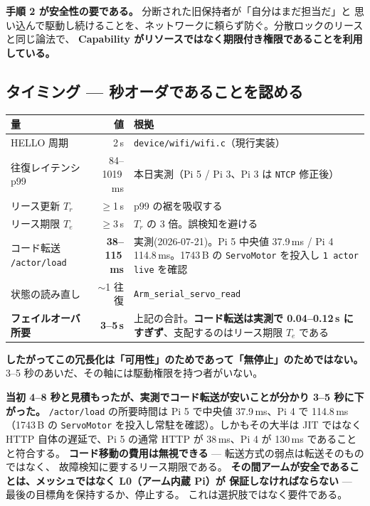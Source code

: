 \documentclass[11pt,a4paper]{article}
\newcommand{\code}[1]{\texttt{#1}}
\newcommand{\prob}[1]{\textbf{\textcolor{red!55!black}{#1}}}
\newcommand{\good}[1]{\textbf{\textcolor{green!45!black}{#1}}}
\begin{document}
\prob{手順 2 が安全性の要である。} 分断された旧保持者が「自分はまだ担当だ」と
思い込んで駆動し続けることを、ネットワークに頼らず防ぐ。分散ロックのリースと同じ論法で、
\textbf{Capability がリソースではなく期限付き権限であることを利用している。}

\subsection{タイミング --- 秒オーダであることを認める}

\begin{center}
\begin{tabular}{@{}l r l@{}}
\toprule
\textbf{量} & \textbf{値} & \textbf{根拠}\\
\midrule
HELLO 周期 & 2\,s & \code{device/wifi/wifi.c}（現行実装）\\
往復レイテンシ p99 & 84--1019\,ms & 本日実測（Pi 5 / Pi 3、Pi 3 は \code{NTCP} 修正後）\\
リース更新 $T_r$ & $\ge$1\,s & p99 の裾を吸収する\\
リース期限 $T_e$ & $\ge$3\,s & $T_r$ の 3 倍。誤検知を避ける\\
コード転送 \code{/actor/load} & \good{38--115\,ms} & 実測(2026-07-21)。Pi 5 中央値 37.9\,ms /
  Pi 4 114.8\,ms。1743\,B の \code{ServoMotor} を投入し \texttt{1 actor live} を確認\\
状態の読み直し & $\sim$1 往復 & \code{Arm\_serial\_servo\_read}\\
\midrule
\prob{フェイルオーバ所要} & \prob{3--5\,s} & 上記の合計。\good{コード転送は実測で
  0.04--0.12\,s にすぎず}、支配するのはリース期限 $T_e$ である\\
\bottomrule
\end{tabular}
\end{center}

\prob{したがってこの冗長化は「可用性」のためであって「無停止」のためではない。}
3--5 秒のあいだ、その軸には駆動権限を持つ者がいない。

\textbf{当初 4--8 秒と見積もったが、実測でコード転送が安いことが分かり 3--5 秒に下がった。}
\code{/actor/load} の所要時間は Pi 5 で中央値 37.9\,ms、Pi 4 で 114.8\,ms
（1743\,B の \code{ServoMotor} を投入し常駐を確認）。しかもその大半は JIT ではなく
HTTP 自体の遅延で、Pi 5 の通常 HTTP が 38\,ms、Pi 4 が 130\,ms であることと符合する。
\good{コード移動の費用は無視できる} --- 転送方式の弱点は転送そのものではなく、
故障検知に要するリース期限である。
\textbf{その間アームが安全であることは、メッシュではなく L0（アーム内蔵 Pi）が
保証しなければならない} --- 最後の目標角を保持するか、停止する。
これは選択肢ではなく要件である。
\end{document}
